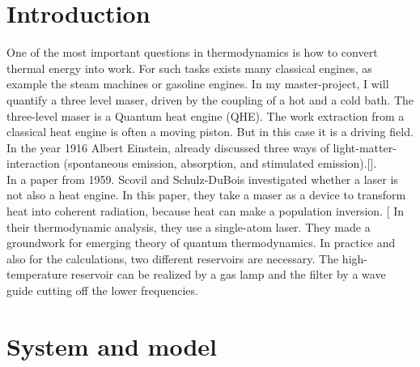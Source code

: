 \documentclass[12pt,a4paper]{article}
\begin{document}
\section{Introduction}
One of the most important questions in thermodynamics is how to convert
thermal energy into work. For such tasks exists many classical engines, as
example the steam machines or gasoline engines. %
In my master-project, I will quantify a three level maser, driven by the coupling of a hot and a cold bath.
The three-level maser is a Quantum heat engine (QHE). The work extraction from a classical heat engine is often a moving piston. But in this case
it is a driving field. In the year 1916 Albert Einstein, already discussed three ways of
light-matter-interaction (spontaneous emission, absorption, and stimulated
emission).[\cite{Li2017}]. \\In a paper from 1959.  Scovil and Schulz-DuBois investigated whether a laser is not
also a heat engine. In this paper, they take a maser as a device to transform heat into coherent radiation, because heat can make a population inversion. [\cite{Scovil1959}
In their thermodynamic analysis, they use a single-atom laser. They made a
groundwork for emerging theory of quantum thermodynamics. In practice and also for the calculations, two different reservoirs are necessary. The high-temperature reservoir can be
realized by a gas lamp and the filter by a wave guide cutting off the
lower frequencies. \cite{Niedenzu2019}

\newpage
\section{System and model}
\end{document}
